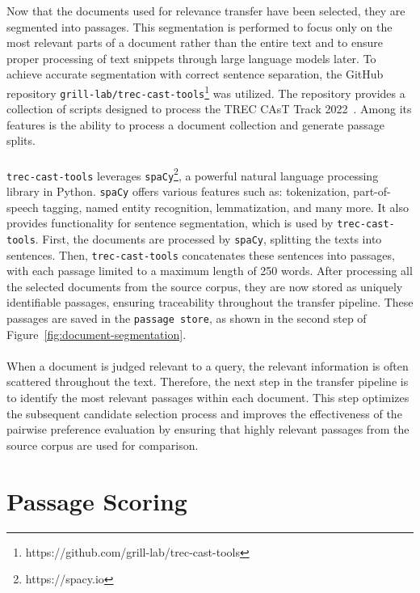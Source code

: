 Now that the documents used for relevance transfer have been selected, they are segmented into passages. This segmentation is performed to focus only on the most relevant parts of a document rather than the entire text and to ensure proper processing of text snippets through large language models later. To achieve accurate segmentation with correct sentence separation, the GitHub repository \texttt{grill-lab/trec-cast-tools}\footnote{https://github.com/grill-lab/trec-cast-tools} was utilized. The repository provides a collection of scripts designed to process the TREC CAsT Track 2022~\citep{owoicho:2022}. Among its features is the ability to process a document collection and generate passage splits.
\\\\
\texttt{trec-cast-tools} leverages \texttt{spaCy}\footnote{https://spacy.io}, a powerful natural language processing library in Python. \texttt{spaCy} offers various features such as: tokenization, part-of-speech tagging, named entity recognition, lemmatization, and many more. It also provides functionality for sentence segmentation, which is used by \texttt{trec-cast-tools}. First, the documents are processed by \texttt{spaCy}, splitting the texts into sentences. Then, \texttt{trec-cast-tools} concatenates these sentences into passages, with each passage limited to a maximum length of 250 words. After processing all the selected documents from the source corpus, they are now stored as uniquely identifiable passages, ensuring traceability throughout the transfer pipeline. These passages are saved in the \texttt{passage store}, as shown in the second step of Figure~\ref{fig:document-segmentation}.
\\\\
When a document is judged relevant to a query, the relevant information is often scattered throughout the text. Therefore, the next step in the transfer pipeline is to identify the most relevant passages within each document. This step optimizes the subsequent candidate selection process and improves the effectiveness of the pairwise preference evaluation by ensuring that highly relevant passages from the source corpus are used for comparison.
\pagebreak


\section{Passage Scoring}\label{passage-scoring}

